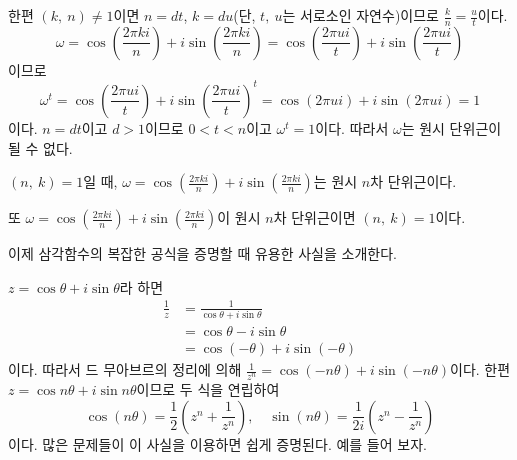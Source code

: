 \documentclass[11pt, a4paper]{book}
\begin{document}
한편 $(k, \: n)\neq 1$이면 $n=dt$, $k=du$(단, $t,\:u$는 서로소인 자연수)이므로 $\frac{k}{n} =\frac{u}{t}$이다. 
\begin{equation*}
\omega=\cos\left(\frac{2\pi ki}{n}\right)+ i \sin\left(\frac{2\pi ki}{n}\right) = \cos\left(\frac{2\pi ui}{t}\right)+ i \sin\left(\frac{2\pi ui}{t}\right)
\end{equation*}
이므로 
\begin{equation*}
\omega^{t} =\cos\left(\frac{2\pi ui}{t}\right)+ i \sin\left(\frac{2\pi ui}{t}\right)^{t} = \cos\left(2\pi ui\right) + i \sin\left(2\pi ui\right)=1
\end{equation*}
이다. $n=dt$이고 $d>1$이므로 $0<t<n$이고 $\omega^{t}=1$이다. 따라서 $\omega$는 원시 단위근이 될 수 없다.
\vspace{1em}
\begin{theorem}[원시 $n$차 단위근 정리]
	$(n,\:k)=1$일 때, $\omega=\cos\left(\frac{2\pi ki}{n}\right)+ i \sin\left(\frac{2\pi ki}{n}\right)$는 원시 $n$차 단위근이다.
	
	 또 $\omega=\cos\left(\frac{2\pi ki}{n}\right)+ i \sin\left(\frac{2\pi ki}{n}\right)$이 원시 $n$차 단위근이면 $(n,\:k)=1$이다.
\end{theorem}

\vspace{1em}


  이제 삼각함수의 복잡한 공식을 증명할 때 유용한 사실을 소개한다.
  
  $z=\cos \theta + i \sin\theta$라 하면
  \begin{align*}
  	\frac{1}{z} &=\frac{1}{\cos \theta + i \sin\theta} \\
  	&= \cos \theta - i \sin\theta \\
  	&=\cos(-\theta) + i \sin(-\theta)
  \end{align*}
이다. 따라서 드 무아브르의 정리에 의해 $\frac{1}{z^{n}} =\cos(-n\theta) + i \sin(-n\theta)$이다. 한편 $z=\cos n\theta + i \sin n\theta$이므로 두 식을 연립하여
\begin{equation*}
	\cos(n\theta) =\frac{1}{2}\left(z^{n} +\frac{1}{z^{n}}\right), \quad \sin(n\theta) =\frac{1}{2i} \left(z^{n} -\frac{1}{z^{n}}\right)
\end{equation*}
이다. 많은 문제들이 이 사실을 이용하면 쉽게 증명된다. 예를 들어 보자.
\end{document}
